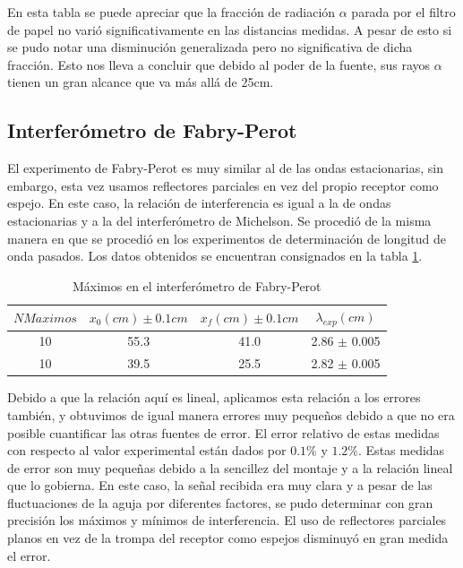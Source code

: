 \documentclass[%
 reprint,
 amsmath,amssymb,
 aps,
]{revtex4-1}
\begin{document}
En esta tabla se puede apreciar que la fracción de radiación $\alpha$ parada por el filtro de papel no varió significativamente en las distancias medidas. A pesar de esto si se pudo notar una disminución generalizada pero no significativa de dicha fracción. Esto nos lleva a concluir que debido al poder de la fuente, sus rayos $\alpha$ tienen un gran alcance que va más allá de 25cm.\\

\subsection{\label{sec:level2}Interferómetro de Fabry-Perot}
El experimento de Fabry-Perot es muy similar al de las ondas estacionarias, sin embargo, esta vez usamos reflectores parciales en vez del propio receptor como espejo. En este caso, la relación de interferencia es igual a la de ondas estacionarias y a la del interferómetro de Michelson. Se procedió de la misma manera en que se procedió en los experimentos de determinación de longitud de onda pasados. Los datos obtenidos se encuentran consignados en la tabla \ref{table:Fabry}.\\

\begin{table}[h!]
\centering
 \begin{tabular}{|c|c|c|c|} 
 \hline
 $N Maximos$& $x_0(cm) \pm 0.1cm$ & $x_f(cm) \pm 0.1cm$ & $\lambda_{exp} (cm)$ \\ [0.5ex] 
 \hline\hline
 10 & 55.3 & 41.0 & 2.86 $\pm$ 0.005\\
 10 & 39.5 & 25.5 & 2.82 $\pm$ 0.005\\
[1ex] 
 \hline
 \end{tabular}
 \caption{Máximos en el interferómetro de Fabry-Perot}
 \label{table:Fabry}
\end{table}

Debido a que la relación aquí es lineal, aplicamos esta relación a los errores también, y obtuvimos de igual manera errores muy pequeños debido a que no era posible cuantificar las otras fuentes de error. El error relativo de estas medidas con respecto al valor experimental están dados por $0.1\%$ y $1.2\%$. Estas medidas de error son muy pequeñas debido a la sencillez del montaje y a la relación lineal que lo gobierna. En este caso, la señal recibida era muy clara y a pesar de las fluctuaciones de la aguja por diferentes factores, se pudo determinar con gran precisión los máximos y mínimos de interferencia. El uso de reflectores parciales planos en vez de la trompa del receptor como espejos disminuyó en gran medida el error. \\
\end{document}
